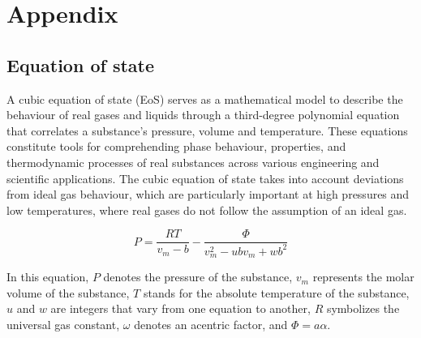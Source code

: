\documentclass[a4paper,fleqn]{cas-dc}
\begin{document}
					
					\clearpage
					
					
					
					\clearpage \appendix \label{appendix}
					\section{Appendix} 
					
					\label{CH: Thermodynamic_details}
					
					\subsection{Equation of state} \label{subsubsec: Equation of state}
					
					A cubic equation of state (EoS) serves as a mathematical model to describe the behaviour of real gases and liquids through a third-degree polynomial equation that correlates a substance's pressure, volume and temperature. These equations constitute tools for comprehending phase behaviour, properties, and thermodynamic processes of real substances across various engineering and scientific applications. The cubic equation of state takes into account deviations from ideal gas behaviour, which are particularly important at high pressures and low temperatures, where real gases do not follow the assumption of an ideal gas.
					
					{\footnotesize
						\begin{equation}
							P = \frac{RT}{v_m-b} - \frac{\Phi}{v_m^2 - ubv_m + wb^2}
						\end{equation}
					}
					
					In this equation, $P$ denotes the pressure of the substance, $v_m$ represents the molar volume of the substance, $T$ stands for the absolute temperature of the substance, $u$ and $w$ are integers that vary from one equation to another, $R$ symbolizes the universal gas constant, $\omega$ denotes an acentric factor, and $\Phi=a\alpha$.
					
\end{document}
